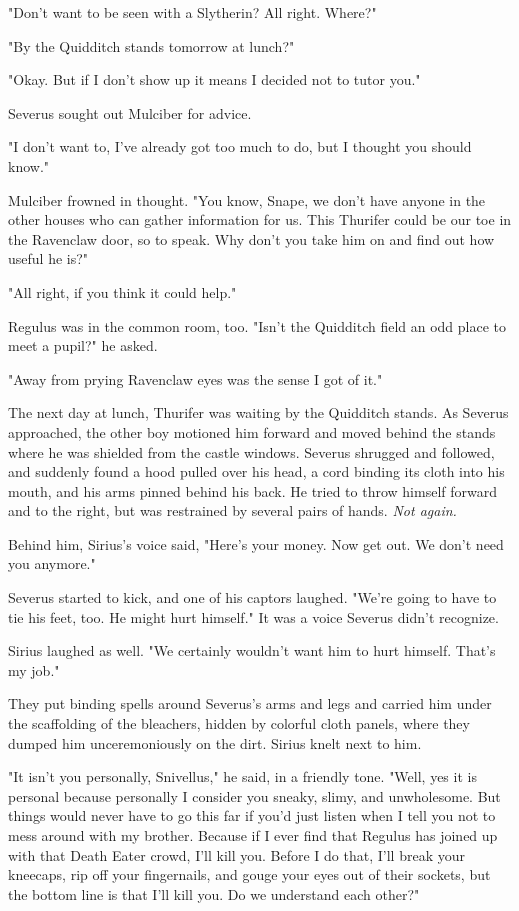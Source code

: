 \documentclass[a4paper,11pt]{article}
\begin{document}
"Don't want to be seen with a Slytherin? All right. Where?"

"By the Quidditch stands tomorrow at lunch?"

"Okay. But if I don't show up it means I decided not to tutor you."

Severus sought out Mulciber for advice.

"I don't want to, I've already got too much to do, but I thought you should know."

Mulciber frowned in thought. "You know, Snape, we don't have anyone in the other houses who can gather information for us. This Thurifer could be our toe in the Ravenclaw door, so to speak. Why don't you take him on and find out how useful he is?"

"All right, if you think it could help."

Regulus was in the common room, too. "Isn't the Quidditch field an odd place to meet a pupil?" he asked.

"Away from prying Ravenclaw eyes was the sense I got of it."

The next day at lunch, Thurifer was waiting by the Quidditch stands. As Severus approached, the other boy motioned him forward and moved behind the stands where he was shielded from the castle windows. Severus shrugged and followed, and suddenly found a hood pulled over his head, a cord binding its cloth into his mouth, and his arms pinned behind his back. He tried to throw himself forward and to the right, but was restrained by several pairs of hands. \emph{Not again.}

Behind him, Sirius's voice said, "Here's your money. Now get out. We don't need you anymore."

Severus started to kick, and one of his captors laughed. "We're going to have to tie his feet, too. He might hurt himself." It was a voice Severus didn't recognize.

Sirius laughed as well. "We certainly wouldn't want him to hurt himself. That's my job."

They put binding spells around Severus's arms and legs and carried him under the scaffolding of the bleachers, hidden by colorful cloth panels, where they dumped him unceremoniously on the dirt. Sirius knelt next to him.

"It isn't you personally, Snivellus," he said, in a friendly tone. "Well, yes it is personal because personally I consider you sneaky, slimy, and unwholesome. But things would never have to go this far if you'd just listen when I tell you not to mess around with my brother. Because if I ever find that Regulus has joined up with that Death Eater crowd, I'll kill you. Before I do that, I'll break your kneecaps, rip off your fingernails, and gouge your eyes out of their sockets, but the bottom line is that I'll kill you. Do we understand each other?"
\end{document}
